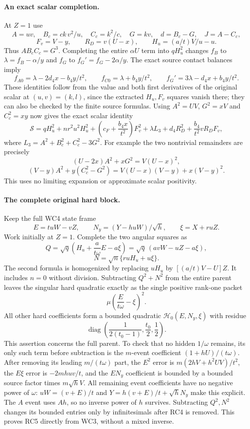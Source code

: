 \paragraph{An exact scalar completion.}
At $Z=1$ use
\[
 A=uv,\quad B_c=ck\,v^2/u,\quad C_c=k^2/c,
 \quad G=kv,\quad d=B_c-G,\quad J=A-C_c,
\]
\[
 F_v=V-y,\qquad R_D=v(U-x),\qquad H_u=(a/t)V/u-u.
\]
Thus $AB_cC_c=G^3$. Completing the entire $\alpha U$ term into
$qH_u^2$ changes $f_B$ to $\lambda=f_B-\alpha/y$ and $f_G$
to $f_G'=f_G-2\alpha/y$. The exact source contact balances imply
\[
 f_{A0}=\lambda-2d_4x-b_4y/t^2,\qquad
 f_{C0}=\lambda+b_4y/t^2,\qquad
 f_G'=3\lambda-d_4x+b_4y/t^2.
 \tag{RC1}
\]
These identities follow from the value and both first derivatives
of the original scalar at $(u,v)=(k,l)$, since the extracted
$H_u,F_v$ squares vanish there; they can also be checked by the
finite source formulas. Using $A^2=UV$, $G^2=xV$ and $C_c^2=xy$
now gives the exact scalar identity
\[
 \mathcal S=qH_u^2+nr^2u^2H_u^2+
 \left(c_F+\frac{b_4x}{t^2}\right)F_v^2
 +\lambda L_3+d_4R_D^2+\frac{b_4}{t^2}vR_DF_v,
 \tag{RC2}
\]
where $L_3=A^2+B_c^2+C_c^2-3G^2$.
For example the two nontrivial remainders are precisely
\[
 (U-2x)A^2+xG^2=V(U-x)^2,
\]
\[
 (V-y)A^2+y(C_c^2-G^2)
       =V(U-x)(V-y)+x(V-y)^2.
\]
This uses no limiting expansion or approximate scalar positivity.

\paragraph{The complete original hard block.}
Keep the full WC4 state frame
\[
 E=tuW-vZ,\qquad N_y=(Y-huW)/\sqrt h,\qquad
 \xi=X+ruZ.
\]
Work initially at $Z=1$. Complete the two angular squares as
\[
 Q=\sqrt q\left(H_u+\frac{a}{t\omega}E-a\xi\right)
   =\sqrt q\,(avW-uZ-a\xi),
\]
\[
 N=\sqrt n\{r uH_u+u\xi\}.
 \tag{RC3}
\]
The second formula is homogenized by replacing $uH_u$ by
$[(a/t)V-U]Z$. It includes $n=0$ without division.
Subtracting $Q^2+N^2$ from the entire parent leaves the singular
hard quadratic exactly as the single positive rank-one packet
\[
 \mu\left(\frac{E}{t\omega}-\xi\right)^2.
 \tag{RC4}
\]
All other hard coefficients form a bounded quadratic
$\mathcal H_0(E,N_y,\xi)$ with residue
\[
 \operatorname{diag}\left(\frac1{2(t_0-1)},\frac{t_0}2,
                                     \frac12\right).
 \tag{RC5}
\]
This assertion concerns the full parent. To check that no hidden
$1/\omega$ remains, its only such term before subtraction is the
$m$-event coefficient $(1+hU)/(t\omega)$.
After removing its leading $m/(t\omega)$ part, the $E^2$ error is
$m(2hV+h^2UV)/t^2$, the $E\xi$ error is $-2mh uv/t$,
and the $EN_y$ coefficient is bounded by a bounded source factor
times $m\sqrt hV$. All remaining event coefficients have no
negative power of $\omega$: $uW=(v+E)/t$ and
$Y=h(v+E)/t+\sqrt hN_y$ make this explicit. The $A$ event uses
$Ah$, so no inverse power of $h$ survives. Subtracting $Q^2,N^2$
changes its bounded entries only by infinitesimals after RC4 is
removed. This proves RC5 directly from WC3, without a mixed inverse.

